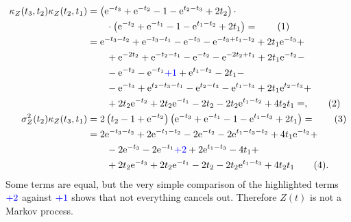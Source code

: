 \documentclass[english, parskip=full]{scrartcl}
\newcommand\numberthis{\addtocounter{equation}{1}\tag{\theequation}}
\newcommand{\kla}{}
\newcommand{\e}{\text{e}}
\begin{document}
\begin{align*}
\kappa_Z(t_3,t_2)\kappa_Z(t_2,t_1) &= \kla\left( \e^{-t_3} + \e^{-t_2} - 1 - \e^{t_2 - t_3} + 2t_2 \right) \cdot \\
&\hspace{0.7cm} \cdot \kla\left( \e^{-t_2} + \e^{-t_1} - 1 - \e^{t_1 - t_2} + 2t_1 \right) = \numberthis \\
&= \e^{-t_3-t_2} + \e^{-t_3-t_1} - \e^{-t_3} - \e^{-t_3+t_1-t_2} + 2t_1\e^{-t_3} + \\
&\hspace{0.7cm} + \e^{-2t_2} + \e^{-t_2-t_1} - \e^{-t_2} - \e^{-2t_2+t_1} + 2t_1\e^{-t_2} - \\
&\hspace{0.7cm} - \e^{-t_2} - \e^{-t_1} {\color{blue}{+ 1}} + \e^{t_1 - t_2} - 2t_1 - \\
&\hspace{0.7cm} - \e^{-t_3} + \e^{t_2-t_3-t_1} - \e^{t_2-t_3} - \e^{t_1 - t_3} + 2t_1\e^{t_2-t_3} + \\
&\hspace{0.7cm} + 2t_2\e^{-t_2} + 2t_2\e^{-t_1} - 2t_2 - 2t_2\e^{t_1 - t_2} + 4t_2t_1 = ,\numberthis\\
\sigma_Z^2(t_2)\kappa_Z(t_3,t_1) &= 2\kla\left( t_2 - 1 + \e^{-t_2} \right)\kla\left( \e^{-t_3} + \e^{-t_1} - 1 - \e^{t_1 - t_3} + 2t_1 \right) = \numberthis \\
&= 2\e^{-t_3-t_2} + 2\e^{-t_1-t_2} - 2\e^{-t_2} - 2\e^{t_1-t_3-t_2} + 4t_1\e^{-t_2} + \\
&\hspace{0.7cm} - 2\e^{-t_3} - 2\e^{-t_1} {\color{blue}{+ 2}} + 2\e^{t_1 - t_3} - 4t_1 + \\
&\hspace{0.7cm} + 2t_2\e^{-t_3} + 2t_2\e^{-t_1} - 2t_2 - 2t_2\e^{t_1 - t_3} + 4t_2t_1 \numberthis.
\end{align*}
Some terms are equal, but the very simple comparison of the highlighted terms ${\color{blue}{+2}}$ against ${\color{blue}{+ 1}}$ shows that not everything cancels out.
Therefore $Z(t)$ is not a Markov process.

\newpage
\end{document}
